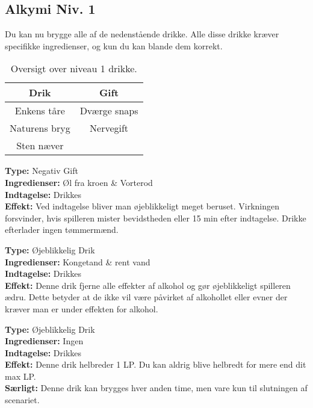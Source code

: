 \subsection{Alkymi Niv. 1}
Du kan nu brygge alle af de nedenstående drikke. Alle disse drikke kræver specifikke ingredienser, og kun du kan blande dem korrekt.\\

\begin{table}[H]
    \centering
    \begin{tabular}{|c|c|}
        \rowcolor{cerulean!80}\hline
        Drik & Gift \\\hline
        Enkens tåre &  Dværge snaps \\\hline
        Naturens bryg & Nervegift \\\hline
        Sten næver &  \\\hline
    \end{tabular}
    \caption{Oversigt over niveau 1 drikke.}
\end{table}

\begin{gift*}
\textbf{Type:} Negativ Gift\\
\textbf{Ingredienser:} Øl fra kroen \& Vorterod\\
\textbf{Indtagelse:} Drikkes\\
\textbf{Effekt:} Ved indtagelse bliver man øjeblikkeligt meget beruset. Virkningen forsvinder, hvis spilleren mister bevidstheden eller 15 min efter indtagelse. Drikke efterlader ingen tømmermænd.\\
\end{gift*}

\begin{drik*}
\textbf{Type:} Øjeblikkelig Drik\\
\textbf{Ingredienser:} Kongetand \& rent vand\\
\textbf{Indtagelse:} Drikkes\\
\textbf{Effekt:} Denne drik fjerne alle effekter af alkohol og gør øjeblikkeligt spilleren ædru. Dette betyder at de ikke vil være påvirket af alkohollet eller evner der kræver man er under effekten for alkohol.\\
\end{drik*}

\begin{drik*}
    \textbf{Type:} Øjeblikkelig Drik\\
    \textbf{Ingredienser:} Ingen\\
    \textbf{Indtagelse:} Drikkes\\
    \textbf{Effekt:} Denne drik helbreder 1 LP. Du kan aldrig blive helbredt for mere end dit max LP.\\
    \textbf{Særligt:} Denne drik kan brygges hver anden time, men vare kun til slutningen af scenariet.
\end{drik*}

